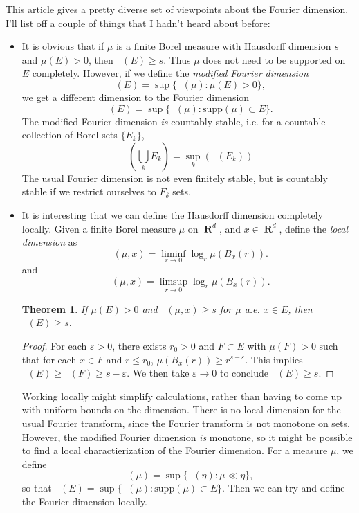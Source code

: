 \documentclass[openany,nobib,nols,a4paper,twoside,symmetric,justified,notoc]{tufte-book}
\theoremstyle{plain}
\newtheorem{theorem}{Theorem}[chapter]
\theoremstyle{remark}
\theoremstyle{definition}
\DeclareMathOperator{\RR}{\mathbf{R}}
\DeclareMathOperator{\fordim}{\text{dim}_{\mathbf{F}}}
\DeclareMathOperator{\hausdim}{\text{dim}_{\mathbf{H}}}
\DeclareMathOperator{\modfordim}{\text{dim}_{\mathbf{MF}}}
\DeclareMathOperator{\lowlocdim}{\underline{\text{dim}_{\mathbf{H}}}}
\DeclareMathOperator{\uplocdim}{\overline{\text{dim}_{\mathbf{H}}}}
\begin{document}
This article gives a pretty diverse set of viewpoints about the Fourier dimension. I'll list off a couple of things that I hadn't heard about before:
%
\begin{itemize}
    \item It is obvious that if $\mu$ is a finite Borel measure with Hausdorff dimension $s$ and $\mu(E) > 0$, then $\hausdim(E) \geq s$. Thus $\mu$ does not need to be supported on $E$ completely. However, if we define the \emph{modified Fourier dimension}
    \begin{equation} \label{ModifiedFourierDimension}
        \modfordim(E) = \sup \{ \fordim(\mu) : \mu(E) > 0 \},
    \end{equation}
    we get a different dimension to the Fourier dimension
    \begin{equation} \label{UsualFourierDimension}
        \fordim(E) = \sup \{ \fordim(\mu) : \text{supp}(\mu) \subset E \}.
    \end{equation}
    The modified Fourier dimension \emph{is} countably stable, i.e. for a countable collection of Borel sets $\{ E_k \}$,
    \[ \modfordim \left( \bigcup_k E_k \right) = \sup_k \left( \fordim(E_k) \right) \]
    The usual Fourier dimension is not even finitely stable, but is countably stable if we restrict ourselves to $F_\delta$ sets.

    \item It is interesting that we can define the Hausdorff dimension completely locally. Given a finite Borel measure $\mu$ on $\RR^d$, and $x \in \RR^d$, define the \emph{local dimension} as
    \[ \lowlocdim(\mu,x) = \liminf_{r \to 0} \log_r \mu(B_x(r)). \]
    and
    \[ \uplocdim(\mu,x) = \limsup_{r \to 0} \log_r \mu(B_x(r)). \]
    \begin{theorem}
        If $\mu(E) > 0$ and $\lowlocdim(\mu,x) \geq s$ for $\mu$ a.e. $x \in E$, then $\hausdim(E) \geq s$.
    \end{theorem}
    \begin{proof}
        For each $\varepsilon > 0$, there exists $r_0 > 0$ and $F \subset E$ with $\mu(F) > 0$ such that for each $x \in F$ and $r \leq r_0$, $\mu(B_x(r)) \geq r^{s - \varepsilon}$. This implies $\hausdim(E) \geq \hausdim(F) \geq s - \varepsilon$. We then take $\varepsilon \to 0$ to conclude $\hausdim(E) \geq s$.
    \end{proof}
    Working locally might simplify calculations, rather than having to come up with uniform bounds on the dimension. There is no local dimension for the usual Fourier transform, since the Fourier transform is not monotone on sets. However, the modified Fourier dimension \emph{is} monotone, so it might be possible to find a local charactierization of the Fourier dimension. For a measure $\mu$, we define
    \[ \modfordim(\mu) = \sup \{ \fordim(\eta): \mu \ll \eta \}, \]
    so that $\modfordim(E) = \sup \{ \modfordim(\mu): \text{supp}(\mu) \subset E \}$. Then we can try and define the Fourier dimension locally.


\end{itemize}
\end{document}
